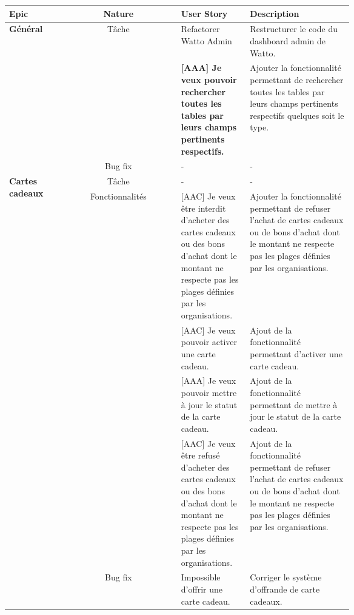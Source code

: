 \documentclass[../main.tex]{subfiles}
\begin{document}
\begin{longtable}{|p{0.165\linewidth} |c| p{0.20\linewidth}| p{0.30\linewidth}|}
    \hline
    \textbf{Epic} & \textbf{Nature} & \textbf{User Story} & \textbf{Description} \\
    \hline
    \multirow{3}{*}{\textbf{Général}} &
    \multirow{2}{*}{Tâche} & 
    Refactorer Watto Admin
    & Restructurer le code du dashboard admin de Watto.\\
    \cline{2-4}
    & 
    \multirow{2}{*}{Fonctionnalités} &
    \textbf{[AAA] Je veux pouvoir rechercher toutes les tables par leurs champs pertinents respectifs.}
    & Ajouter la fonctionnalité permettant de rechercher toutes les tables par leurs champs pertinents respectifs quelques soit le type. \\
    \cline{2-4}
    & 
    Bug fix & - & - \\
    \hline
    
    \multirow{3}{*}{\textbf{Cartes cadeaux}} &
    Tâche & -
    & - \\
    \cline{2-4}
    &
    \multirow{2}{*}{Fonctionnalités} &
    [AAC] Je veux être interdit d'acheter des cartes cadeaux ou des bons d'achat dont le montant ne respecte pas les plages définies par les organisations.
    & Ajouter la fonctionnalité permettant de refuser l'achat de cartes cadeaux ou de bons d'achat dont le montant ne respecte pas les plages définies par les organisations. \\
    \cline{3-4}
    &
    & 
    [AAC] Je veux pouvoir activer une carte cadeau.
    & Ajout de la fonctionnalité permettant d'activer une carte cadeau. \\
    \cline{3-4}
    &
    & 
    [AAA] Je veux pouvoir mettre à jour le statut de la carte cadeau.
    & Ajout de la fonctionnalité permettant de mettre à jour le statut de la carte cadeau.  \\
    \cline{3-4}
    &
    & 
    [AAC] Je veux être refusé d'acheter des cartes cadeaux ou des bons d'achat dont le montant ne respecte pas les plages définies par les organisations.
    & Ajout de la fonctionnalité permettant de refuser l'achat de cartes cadeaux ou de bons d'achat dont le montant ne respecte pas les plages définies par les organisations.  \\
    \cline{2-4}
    &
    Bug fix & 
    Impossible d'offrir une carte cadeau.
    & Corriger le système d'offrande de carte cadeaux. \\
    \hline


\end{longtable}
\end{document}
